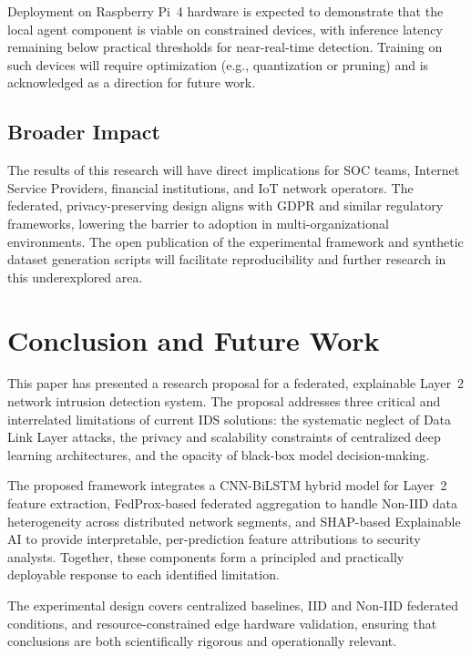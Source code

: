 \documentclass[conference]{IEEEtran}
\begin{document}
Deployment on Raspberry Pi~4 hardware is expected to demonstrate that the local agent
component is viable on constrained devices, with inference latency remaining below
practical thresholds for near-real-time detection. Training on such devices will
require optimization (e.g., quantization or pruning) and is acknowledged as a
direction for future work.

\subsection{Broader Impact}

The results of this research will have direct implications for SOC teams, Internet
Service Providers, financial institutions, and IoT network operators. The federated,
privacy-preserving design aligns with GDPR and similar regulatory frameworks,
lowering the barrier to adoption in multi-organizational environments. The open
publication of the experimental framework and synthetic dataset generation scripts
will facilitate reproducibility and further research in this underexplored area.

\section{Conclusion and Future Work}
\label{sec:conclusion}

This paper has presented a research proposal for a federated, explainable Layer~2
network intrusion detection system. The proposal addresses three critical and
interrelated limitations of current IDS solutions: the systematic neglect of Data
Link Layer attacks, the privacy and scalability constraints of centralized deep
learning architectures, and the opacity of black-box model decision-making.

The proposed framework integrates a CNN-BiLSTM hybrid model for Layer~2 feature
extraction, FedProx-based federated aggregation to handle Non-IID data heterogeneity
across distributed network segments, and SHAP-based Explainable AI to provide
interpretable, per-prediction feature attributions to security analysts. Together,
these components form a principled and practically deployable response to each
identified limitation.

The experimental design covers centralized baselines, IID and Non-IID federated
conditions, and resource-constrained edge hardware validation, ensuring that
conclusions are both scientifically rigorous and operationally relevant.
\end{document}
